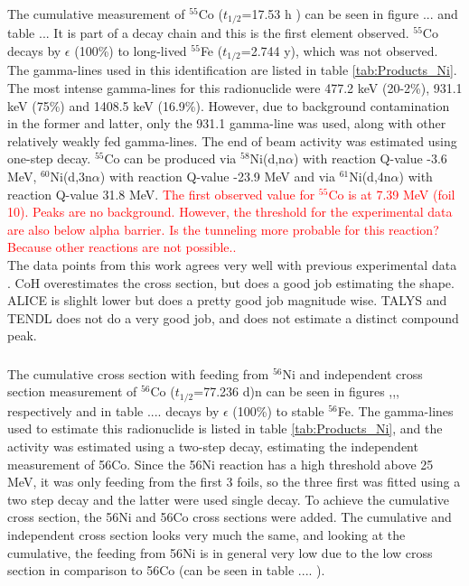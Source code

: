 \subsubsection{}
The cumulative measurement of $^{55}$Co ($t_{1/2}$=17.53 h \cite{Junde2008})  can be seen in figure ... and table ... It is part of a decay chain and this is the first element observed. $^{55}$Co decays by $\epsilon$ (100\%) to long-lived $^{55}$Fe ($t_{1/2}$=2.744 y), which was not observed. The gamma-lines used in this identification are listed in table \ref{tab:Products_Ni}. The most intense gamma-lines for this radionuclide were 477.2 keV (20-2\%), 931.1 keV (75\%) and 1408.5 keV (16.9\%). However, due to background contamination in the former and latter, only the 931.1 gamma-line was used, along with other relatively weakly fed gamma-lines. The end of beam activity was estimated using one-step decay. $^{55}$Co can be produced via $^{58}$Ni(d,n$\alpha$) with reaction Q-value -3.6 MeV, $^{60}$Ni(d,3n$\alpha$) with reaction Q-value -23.9 MeV and via $^{61}$Ni(d,4n$\alpha$) with reaction Q-value 31.8 MeV. \textcolor{red}{The first observed value for $^{55}$Co is at 7.39 MeV (foil 10). Peaks are no background. However, the threshold for the experimental data are also below alpha barrier. Is the tunneling more probable for this reaction? Because other reactions are not possible..}\\
\noindent 
The data points from this work agrees very well with previous experimental data \cite{Ochiai2007, Avrigeanu2016, Usman2016, Hermanne2013, Takacs2007, Takacs1997, Zweit1991, Amjed2013}. CoH overestimates the cross section, but does a good job estimating the shape. ALICE is slighlt lower but does a pretty good job magnitude wise. TALYS and TENDL does not do a very good job, and does not estimate a distinct compound peak. 


\subsubsection{}
The cumulative cross section with feeding from $^{56}$Ni and independent cross section measurement of $^{56}$Co ($t_{1/2}$=77.236 d)n\cite{Junde2011} can be seen in figures ,,, respectively and in table .... decays by $\epsilon$ (100\%) to stable $^{56}$Fe. The gamma-lines used to estimate this radionuclide is listed in table \ref{tab:Products_Ni}, and the activity was estimated using a two-step decay, estimating the independent measurement of 56Co. Since the 56Ni reaction has a high threshold above 25 MeV, it was only feeding from the first 3 foils, so the three first was fitted using a two step decay and the latter were used single decay. To achieve the cumulative cross section, the 56Ni and 56Co cross sections were added. The cumulative and independent cross section looks very much the same, and looking at the cumulative, the feeding from 56Ni is in general very low due to the low cross section in comparison to 56Co (can be seen in table .... ). 

